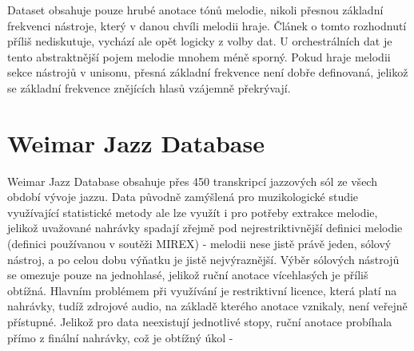 Dataset obsahuje pouze hrubé anotace tónů melodie, nikoli přesnou základní frekvenci nástroje, který v danou chvíli melodii hraje. Článek o tomto rozhodnutí příliš nediskutuje, vychází ale opět logicky z volby dat. U orchestrálních dat je tento abstraktnější pojem melodie mnohem méně sporný. Pokud hraje melodii sekce nástrojů v unisonu, přesná základní frekvence není dobře definovaná, jelikož se základní frekvence znějících hlasů vzájemně překrývají.

\section{Weimar Jazz Database}

Weimar Jazz Database \cite{Pfleiderer} obsahuje přes 450 transkripcí jazzových sól ze všech období vývoje jazzu. Data původně zamýšlená pro muzikologické studie využívající statistické metody ale lze využít i pro potřeby extrakce melodie, jelikož uvažované nahrávky spadají zřejmě pod nejrestriktivnější definici melodie (definici používanou v soutěži MIREX) - melodii nese jistě právě jeden, sólový nástroj, a po celou dobu výňatku je jistě nejvýraznější. Výběr sólových nástrojů se omezuje pouze na jednohlasé, jelikož ruční anotace vícehlasých je příliš obtížná. Hlavním problémem při využívání je restriktivní licence, která platí na nahrávky, tudíž zdrojové audio, na základě kterého anotace vznikaly, není veřejně přístupné.
Jelikož pro data neexistují jednotlivé stopy, ruční anotace probíhala přímo z finální nahrávky, což je obtížný úkol - 
